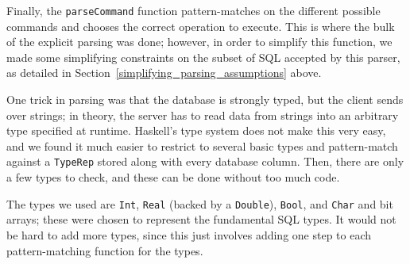 Finally, the \verb+parseCommand+ function pattern-matches on the different possible commands and chooses the correct operation to execute. This is where the bulk of the explicit parsing was done; however, in order to simplify this function, we made some simplifying constraints on the subset of SQL accepted by this parser, as detailed in Section~\ref{simplifying_parsing_assumptions} above.

One trick in parsing was that the database is strongly typed, but the client sends over strings; in theory, the server has to read data from strings into an arbitrary type specified at runtime. Haskell's type system does not make this very easy, and we found it much easier to restrict to several basic types and pattern-match against a \verb+TypeRep+ stored along with every database column. Then, there are only a few types to check, and these can be done without too much code.

The types we used are \verb+Int+, \verb+Real+ (backed by a \verb+Double+), \verb+Bool+, and \verb+Char+ and bit arrays; these were chosen to represent the fundamental SQL types. It would not be hard to add more types, since this just involves adding one step to each pattern-matching function for the types.
